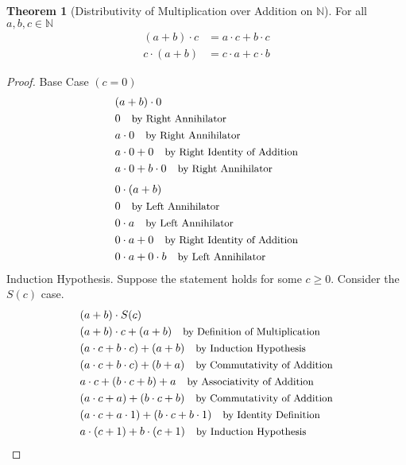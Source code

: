 \documentclass[12pt]{article}
\newcommand{\stext}[1]{\quad\text{\small #1}}
\theoremstyle{definition}
\newtheorem{theorem}{Theorem}
\begin{document}
\begin{theorem}[Distributivity of Multiplication over Addition on $\mathbb{N}$]
    For all $a, b, c \in \mathbb{N}$
    \begin{align*}
        (a + b) \cdot c &= a \cdot c + b \cdot c \\
        c \cdot (a + b) &= c \cdot a + c \cdot b 
    \end{align*}
\end{theorem}
\begin{proof} Base Case $(c = 0)$
    \begin{align*}
        & (a + b) \cdot 0 \\
        & 0 \stext{by Right Annihilator}\\ 
        & a \cdot 0 \stext{by Right Annihilator}\\
        & a \cdot 0 + 0 \stext{by Right Identity of Addition}\\ 
        & a \cdot 0 + b \cdot 0 \stext{by Right Annihilator}
    \end{align*}
    \begin{align*}
        & 0 \cdot (a + b) \\
        & 0 \stext{by Left Annihilator}\\
        & 0 \cdot a \stext{by Left Annihilator}\\ 
        & 0 \cdot a + 0 \stext{by Right Identity of Addition}\\ 
        & 0 \cdot a + 0 \cdot b \stext{by Left Annihilator}
    \end{align*}
    Induction Hypothesis. Suppose the statement holds for some $c \geq 0$. Consider the $S(c)$ case.
    \begin{align*}
        & (a + b) \cdot S(c) \\ 
        & (a + b) \cdot c + (a + b) \stext{by Definition of Multiplication} \\ 
        & (a \cdot c + b \cdot c) + (a + b) \stext{by Induction Hypothesis} \\
        & (a \cdot c + b \cdot c) + (b + a) \stext{by Commutativity of Addition} \\ 
        & a \cdot c + (b \cdot c + b) + a \stext{by Associativity of Addition} \\ 
        & (a \cdot c + a) + (b \cdot c + b) \stext{by Commutativity of Addition} \\
        & (a \cdot c + a \cdot 1) + (b \cdot c + b \cdot 1) \stext{by Identity Definition} \\ 
        & a \cdot (c + 1) + b \cdot (c + 1) \stext{by Induction Hypothesis} \\ 

\end{align*}
\end{proof}
\end{document}
